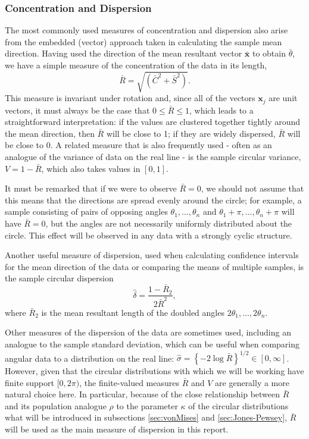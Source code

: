 \documentclass[../../ArchStats.tex]{subfiles}
\begin{document}
\subsubsection{Concentration and Dispersion}

The most commonly used measures of concentration and dispersion also arise from the embedded (vector) approach taken in calculating the sample mean direction. Having used the direction of the mean resultant vector $\mathbf{\bar{x}}$ to obtain $\bar{\theta}$, we have a simple measure of the concentration of the data in its length, 
	\begin{equation}
	\label{eqn:R-bar}
	\bar{R} = \sqrt{(\bar{C}^2 + \bar{S}^2)}.
	\end{equation}
This measure is invariant under rotation and, since all of the vectors $\mathbf{x}_j$ are unit vectors, it must always be the case that $0 \leq \bar{R} \leq 1$, which leads to a straightforward interpretation: if the values are clustered together tightly around the mean direction, then $\bar{R}$ will be close to 1; if they are widely dispersed, $\bar{R}$ will be close to 0. A related measure that is also frequently used - often as an analogue of the variance of data on the real line - is the sample circular variance, $V = 1- \bar{R}$, which also takes values in $[0,1]$. 

It must be remarked that if we were to observe $\bar{R} = 0$, we should not assume that this means that the directions are spread evenly around the circle; for example, a sample consisting of pairs of opposing angles $\theta_1, \dots, \theta_n$ and $\theta_1+\pi, \dots, \theta_n+\pi$ will have $\bar{R} = 0$, but the angles are not necessarily uniformly distributed about the circle. This effect will be observed in any data with a strongly cyclic structure.

Another useful measure of dispersion, used when calculating confidence intervals for the mean direction of the data or comparing the means of multiple samples, is the sample circular dispersion
	\begin{equation}
	\label{eqn:delta-i}
	\hat{\delta} = \frac{1-\bar{R}_2}{2\bar{R}^2},
	\end{equation}
where $\bar{R}_2$ is the mean resultant length of the doubled angles $2\theta_1, \dots, 2\theta_n$. 

Other measures of the dispersion of the data are sometimes used, including an analogue to the  sample standard deviation, which can be useful when comparing angular data to a distribution on the real line: $\hat{\sigma} = \left\lbrace -2 \log \bar{R} \right\rbrace ^{1/2} \in [0, \infty]$. However, given that the circular distributions with which we will be working have finite support $[0, 2\pi)$, the finite-valued measures $\bar{R}$ and $V$ are generally a more natural choice here. In particular, because of the close relationship between $\bar{R}$ and its population analogue $\rho$ to the parameter $\kappa$ of the circular distributions what will be introduced in subsections \ref{sec:vonMises} and \ref{sec:Jones-Pewsey}, $\bar{R}$ will be used as the main measure of dispersion in this report.
 
\end{document}
